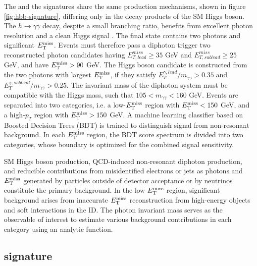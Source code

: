 The \monohgamgam and the \monohbb signatures share the same production mechanisms, shown in figure \ref{fig:hbb-signature}, differing only in the decay products of the SM Higgs boson.
The $h\rightarrow \gamma\gamma$ decay, despite a small branching ratio, benefits from excellent photon resolution and a clean Higgs signal \cite{HIGG-2019-02}. The final state contains two photons and significant $E_{\mathrm{T}}^{\mathrm{miss}}$. Events must therefore pass a diphoton trigger two reconstructed photon candidates having $E_{T,lead}^{miss}\ge 35$ GeV and $E_{T,sublead}^{miss}\ge 25$ GeV, and have $E_{\mathrm{T}}^{\mathrm{miss}}>90$ GeV. The Higgs boson candidate is constructed from the two photons with largest $E_{\mathrm{T}}^{\mathrm{miss}}$, if they satisfy $E_T^{\gamma, lead}/m_{\gamma\gamma} > 0.35$ and $E_T^{\gamma, sublead}/m_{\gamma\gamma} > 0.25$. The invariant mass of the diphoton system must be compatible with the Higgs mass, such that $105 < m_{\gamma\gamma} < 160$ GeV. Events are separated into two categories, i.e. a low-$E_{\mathrm{T}}^{\mathrm{miss}}$ region with $E_{\mathrm{T}}^{\mathrm{miss}}<150$ GeV, and a high-$p_T$ region with $E_{\mathrm{T}}^{\mathrm{miss}}>150$ GeV. A machine learning classifier based on Boosted Decision Trees (BDT) is trained to distinguish \thdma signal from non-resonant background. In each $E_{\mathrm{T}}^{\mathrm{miss}}$ region, the BDT score spectrum is divided into two categories, whose boundary is optimized for the combined signal sensitivity. 

SM Higgs boson production, QCD-induced non-resonant diphoton production, and reducible contributions from misidentified electrons or jets as photons and $E_{\mathrm{T}}^{\mathrm{miss}}$ generated by particles outside of detector acceptance or by neutrinos constitute the primary background. In the low $E_{\mathrm{T}}^{\mathrm{miss}}$ region, significant background arises from inaccurate $E_{\mathrm{T}}^{\mathrm{miss}}$ reconstruction from high-energy objects and soft interactions in the ID. The photon invariant mass serves as the observable of interest to estimate various background contributions in each category using an analytic function.

\subsection{\texorpdfstring{\monohtautau}{TEXT} signature}

